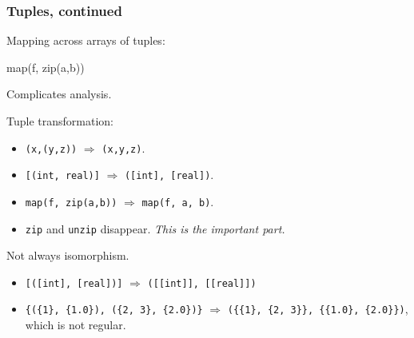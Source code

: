 \documentclass{beamer}
\renewcommand{\emph}[1]{\textcolor{structure}{#1}}
\newcommand{\emp}[1]{\textcolor{DikuRed}{ #1}}
\newcommand{\LO}{$\mathcal{L}_0$}
\begin{document}
\begin{frame}[fragile,t]
  \frametitle{Tuples, continued}

  Mapping across arrays of tuples:

  \begin{colorcode}
    map(f, zip(a,b))
  \end{colorcode}

  Complicates analysis.

\pause

Tuple transformation:

  \begin{itemize}
  \item {\tt (x,(y,z))} $\Rightarrow$ {\tt (x,y,z)}.
  \item {\tt [(int, real)]} $\Rightarrow$ {\tt ([int], [real])}.
  \item {\tt map(f, zip(a,b))} $\Rightarrow$ {\tt map(f, a, b)}.
  \item {\tt zip} and {\tt unzip} disappear.  {\em This is the important part.}
  \end{itemize}

\pause

Not always isomorphism.

\begin{itemize}
\item {\tt [([int], [real])]} $\Rightarrow$ {\tt([[int]], [[real]])}
\item {\tt\{(\{1\}, \{1.0\}), (\{2, 3\}, \{2.0\})\}} $\Rightarrow$
  {\tt(\{\{1\}, \{2, 3\}\}, \{\{1.0\}, \{2.0\}\})}, which is not
  regular.
\end{itemize}

\end{frame}


\end{document}
